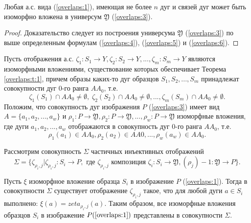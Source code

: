 \begin{theorem}
Любая а.с. вида (\ref{overlaps:1}), имеющая не более $n$ дуг и связей дуг может быть изоморфно вложена в универсум  $\mathfrak{Y}$  (\ref{overlaps:3}).
\label{overlaps:t:1}
\end{theorem}
\begin{proof}
Доказательство следует из построения универсума $\mathfrak{Y}$  (\ref{overlaps:3}) по выше определенным формулам (\ref{overlaps:4}), (\ref{overlaps:5}) и  (\ref{overlaps:6}).
\end{proof} 

Пусть отображения а.с.  $\zeta_1 : S_1\to Y , \zeta_2: S_2 \to Y , ..., \zeta_m: S_m \to Y$  являются изоморфными вложениями, существование которых обеспечивает Теорема \ref{overlaps:t:1}, причем образы каких-то дуг образцов $S_1,  S_2 , ..., S_m$ принадлежат   совокупности дуг 0-го ранга $AA_0$, т.е. 
\begin{equation}
\zeta_1 (S_1) \cap  AA_0  \neq \emptyset,\;\zeta_2 (S_2) \cap  AA_0 \neq \emptyset, ..., \zeta_m(S_m) \cap  AA_0 \neq \emptyset.
\label{overlaps:7}
\end{equation}
Положим, что совокупность дуг изображения $P$ (\ref{overlaps:3}) имеет вид
$A = \{a_1, a_2, ..., a_w\}$ и $\rho_1 : P \to \mathfrak{Y} , \rho_2: P \to \mathfrak{Y}, ..., \rho_w: P \to \mathfrak{Y}$  изоморфные вложения, где дуги  $a_1, a_2, ..., a_w$ отображаются в совокупность дуг 0-го ранга $AA_0$, т.е. 
\begin{equation}
\rho_1(a_1) \in AA_0, \rho_2(a_2) \in AA0, ..., \rho_w (a_w) \in AA_0.
\label{overlaps:8}
\end{equation}

Рассмотрим совокупность $\Sigma$ частичных инъективных отображений  
\begin{equation}
\Sigma = \{ \zeta_{\rho_i,j} | \zeta_{\rho_i,j} : S_i \to P,\text{ где } \zeta_{\rho_i,j} \text{ композиция } \zeta_i : S_i \to \mathfrak{Y} , (\rho_j)-1 : \mathfrak{Y} \to P \}.
\label{overlaps:9}
\end{equation}

\begin{theorem}
Пусть  $\xi$  изоморфное вложение образца  $S_i$  в изображение  $P$  (\ref{overlaps:1}). Тогда в совокупности  $\Sigma$  существует отображение  $\zeta_{\rho_i,j}$  такое, что для любой дуги $a \in S_i$ выполнено: $\xi(a) = zeta_{\rho_i,j}(a)$. Таким образом, все изоморфные  вложения образцов  $S_i$  в изображение  $P (\ref{overlaps:1})$ представлены в совокупности $\Sigma$.
\label{overlaps:t:2}
\end{theorem}

